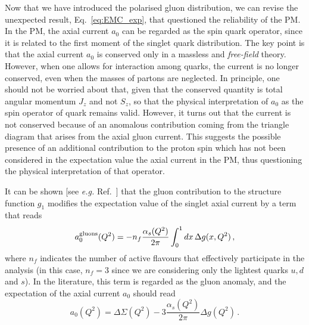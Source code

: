 Now that we have introduced the polarised gluon distribution, we can revise the unexpected result, Eq.~\eqref{eq:EMC_exp}, that questioned the reliability of the PM. In the PM, the axial current $a_0$ can be regarded as the spin quark operator, since it is related to the first moment of the singlet quark distribution. The key point is that the axial current $a_0$ is conserved only in a massless and \textit{free-field} theory. However, when one allows for interaction among quarks, the current is no longer conserved, even when the masses of partons are neglected. In principle, one should not be worried about that, given that the conserved quantity is total angular momentum $J_z$ and not $S_z$, so that the physical interpretation of $a_0$ as the spin operator of quark remains valid. However, it turns out that the current is not conserved because of an anomalous contribution coming from the triangle diagram that arises from the axial gluon current. This suggests the possible presence of an additional contribution to the proton spin which has not been considered in the expectation value the axial current in the PM, thus questioning the physical interpretation of that operator.\par
It can be shown [see \textit{e.g.} Ref.~\cite{Anselmino:1993tc}] that the gluon contribution to the structure function $g_1$ modifies the expectation value of the singlet axial current by a term that reads
\begin{equation}
  a_{0}^{\textrm{gluons}}(Q^2) = - n_{f} \frac{\alpha_s(Q^2)}{2\pi} \int_{0}^{1} dx \, \Delta g (x, Q^2) \,,
\end{equation}
where $n_{f}$ indicates the number of active flavours that effectively participate in the analysis (in this case, $n_f = 3$ since we are considering only the lightest quarks $u,d$ and $s$). In the literature, this term is regarded as the gluon anomaly, and the expectation of the axial current $a_0$ should read
\begin{equation}
  a_{0} (Q^2) = \Delta \Sigma (Q^2) - 3 \frac{\alpha_{s}(Q^2)}{2\pi} \Delta g (Q^2) \,.
  \label{eq:a0_gluon}
\end{equation}
